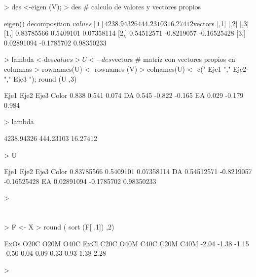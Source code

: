 \documentclass{article}
\begin{document}
\begin{Schunk}
\begin{Sinput}
> des <-eigen (V); 
> des # calculo de valores y vectores propios
\end{Sinput}
\begin{Soutput}
eigen() decomposition
$values
[1] 4238.94326  444.23103   16.27412

$vectors
           [,1]       [,2]        [,3]
[1,] 0.83785566  0.5409101  0.07358114
[2,] 0.54512571 -0.8219057 -0.16525428
[3,] 0.02891094 -0.1785702  0.98350233
\end{Soutput}
\begin{Sinput}
> lambda <-des$values
> U <- des$vectors # matriz con vectores propios en columnas
> rownames(U) <- rownames (V)
> colnames(U) <- c(" Eje1 "," Eje2 "," Eje3 "); round (U ,3)
\end{Sinput}
\begin{Soutput}
       Eje1   Eje2   Eje3 
Color  0.838  0.541  0.074
DA     0.545 -0.822 -0.165
EA     0.029 -0.179  0.984
\end{Soutput}
\begin{Sinput}
> lambda
\end{Sinput}
\begin{Soutput}
[1] 4238.94326  444.23103   16.27412
\end{Soutput}
\begin{Sinput}
> U
\end{Sinput}
\begin{Soutput}
           Eje1       Eje2        Eje3 
Color 0.83785566  0.5409101  0.07358114
DA    0.54512571 -0.8219057 -0.16525428
EA    0.02891094 -0.1785702  0.98350233
\end{Soutput}
\begin{Sinput}
> 
\end{Sinput}
\end{Schunk}

\section{}

\begin{Schunk}
\begin{Sinput}
> F <- X %*% U
> round ( sort (F[ ,1]) ,2)
\end{Sinput}
\begin{Soutput}
 ExOs  O20C  O20M  O40C  ExCl  C20C  O40M  C40C  C20M  C40M 
-2.04 -1.38 -1.15 -0.50  0.04  0.09  0.33  0.93  1.38  2.28 
\end{Soutput}
\begin{Sinput}
> 
\end{Sinput}
\end{Schunk}
\end{document}
